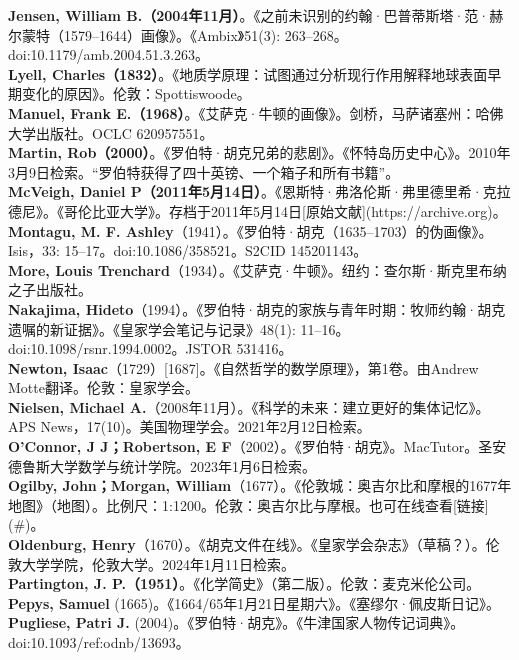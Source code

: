 \textbf{Jensen, William B.（2004年11月）}。《之前未识别的约翰·巴普蒂斯塔·范·赫尔蒙特（1579–1644）画像》。《Ambix》51(3): 263–268。doi:10.1179/amb.2004.51.3.263。\\
\textbf{Lyell, Charles（1832）}。《地质学原理：试图通过分析现行作用解释地球表面早期变化的原因》。伦敦：Spottiswoode。\\
\textbf{Manuel, Frank E.（1968）}。《艾萨克·牛顿的画像》。剑桥，马萨诸塞州：哈佛大学出版社。OCLC 620957551。\\
\textbf{Martin, Rob（2000）}。《罗伯特·胡克兄弟的悲剧》。《怀特岛历史中心》。2010年3月9日检索。“罗伯特获得了四十英镑、一个箱子和所有书籍”。\\
\textbf{McVeigh, Daniel P（2011年5月14日）}。《恩斯特·弗洛伦斯·弗里德里希·克拉德尼》。《哥伦比亚大学》。存档于2011年5月14日[原始文献](https://archive.org)。\\
\textbf{Montagu, M. F. Ashley}（1941）。《罗伯特·胡克（1635–1703）的伪画像》。Isis，33: 15–17。doi:10.1086/358521。S2CID 145201143。\\
\textbf{More, Louis Trenchard}（1934）。《艾萨克·牛顿》。纽约：查尔斯·斯克里布纳之子出版社。\\
\textbf{Nakajima, Hideto}（1994）。《罗伯特·胡克的家族与青年时期：牧师约翰·胡克遗嘱的新证据》。《皇家学会笔记与记录》48(1): 11–16。doi:10.1098/rsnr.1994.0002。JSTOR 531416。\\
\textbf{Newton, Isaac}（1729）[1687]。《自然哲学的数学原理》，第1卷。由Andrew Motte翻译。伦敦：皇家学会。\\
\textbf{Nielsen, Michael A.}（2008年11月）。《科学的未来：建立更好的集体记忆》。APS News，17(10)。美国物理学会。2021年2月12日检索。\\
\textbf{O'Connor, J J；Robertson, E F}（2002）。《罗伯特·胡克》。MacTutor。圣安德鲁斯大学数学与统计学院。2023年1月6日检索。\\
\textbf{Ogilby, John；Morgan, William}（1677）。《伦敦城：奥吉尔比和摩根的1677年地图》（地图）。比例尺：1:1200。伦敦：奥吉尔比与摩根。也可在线查看[链接](#)。\\
\textbf{Oldenburg, Henry}（1670）。《胡克文件在线》。《皇家学会杂志》（草稿？）。伦敦大学学院，伦敦大学。2024年1月11日检索。\\
\textbf{Partington, J. P.（1951）}。《化学简史》（第二版）。伦敦：麦克米伦公司。\\
\textbf{Pepys, Samuel} (1665)。《1664/65年1月21日星期六》。《塞缪尔·佩皮斯日记》。\\
\textbf{Pugliese, Patri J.} (2004)。《罗伯特·胡克》。《牛津国家人物传记词典》。doi:10.1093/ref:odnb/13693。\\
